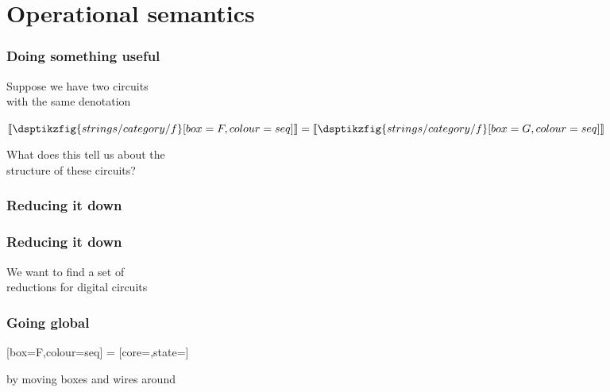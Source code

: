 \section{Operational semantics}

\begin{frame}
    \frametitle{Doing something useful}

    \centering

    \LARGE
    Suppose we have two circuits \\
    with the same denotation
    \normalsize

    \vspace{2em}

    \(
        \llbracket\dsptikzfig{strings/category/f}[box=F,colour=seq]\rrbracket
        =
        \llbracket\dsptikzfig{strings/category/f}[box=G,colour=seq]\rrbracket
    \)

    \vspace{2em}

    \LARGE
    \pause
    What does this tell us about the \\
    \alert{structure} of these circuits?

\end{frame}

\begin{frame}
    \frametitle{Reducing it down}

    \pause

    \centering


\end{frame}
\begin{frame}
    \frametitle{Reducing it down}

    \centering
    \LARGE

    We want to find a set of \\ \alert{reductions} for digital circuits

\end{frame}
\begin{frame}
    \frametitle{Going global}

    \centering

    [box=F,colour=seq]
    \Large=\normalsize
    [core=,state=]

    \vspace{1em}
    \Large
    by moving boxes and wires around
\end{frame}


